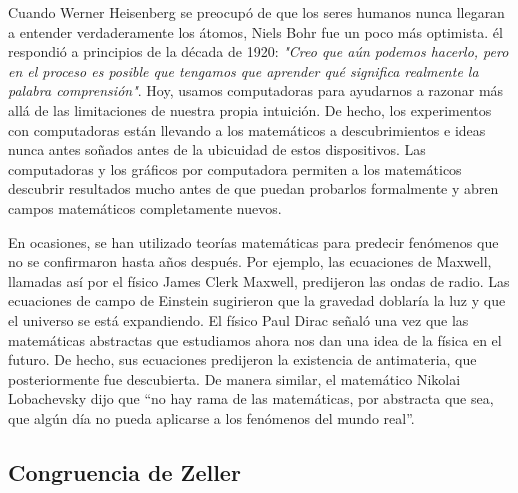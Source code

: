 \documentclass{article}
\begin{document}
Cuando Werner Heisenberg se preocup\'o de que los seres humanos nunca llegaran a
entender verdaderamente los \'atomos, Niels Bohr fue un poco m\'as optimista. \'el
respondi\'o a principios de la d\'ecada de 1920: \textit{"Creo que a\'un podemos
hacerlo, pero en el proceso es posible que tengamos que aprender qu\'e significa
realmente la palabra comprensi\'on"}. Hoy, usamos computadoras para ayudarnos a
razonar m\'as all\'a de las limitaciones de nuestra propia intuici\'on. De hecho, los
experimentos con computadoras est\'an llevando a los matem\'aticos a descubrimientos
e ideas nunca antes so\~nados antes de la ubicuidad de estos dispositivos. Las
computadoras y los gr\'aficos por computadora permiten a los matem\'aticos descubrir
resultados mucho antes de que puedan probarlos formalmente y abren campos
matem\'aticos completamente nuevos. 

En ocasiones, se han utilizado teor\'ias matem\'aticas para predecir fen\'omenos que
no se confirmaron hasta a\~nos despu\'es. Por ejemplo, las ecuaciones de Maxwell,
llamadas as\'i por el f\'isico James Clerk Maxwell, predijeron las ondas de radio.
Las ecuaciones de campo de Einstein sugirieron que la gravedad doblar\'ia la luz y
que el universo se est\'a expandiendo. El f\'isico Paul Dirac se\~nal\'o una vez que las
matem\'aticas abstractas que estudiamos ahora nos dan una idea de la f\'isica en el
futuro. De hecho, sus ecuaciones predijeron la existencia de antimateria, que
posteriormente fue descubierta. De manera similar, el matem\'atico Nikolai
Lobachevsky dijo que “no hay rama de las matem\'aticas, por abstracta que sea, que
alg\'un d\'ia no pueda aplicarse a los fen\'omenos del mundo real”.


\subsection{Congruencia de Zeller}

%    





\pagebreak
 

\end{document}
